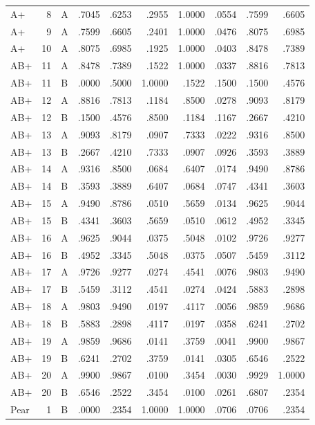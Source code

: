 \begin{longtable}{@{}lrlrrrrrrr@{}}
A+ & 8 & A & .7045 & .6253 & .2955 & 1.0000 & .0554 & .7599 & .6605 \\
A+ & 9 & A & .7599 & .6605 & .2401 & 1.0000 & .0476 & .8075 & .6985 \\
A+ & 10 & A & .8075 & .6985 & .1925 & 1.0000 & .0403 & .8478 & .7389 \\
AB+ & 11 & A & .8478 & .7389 & .1522 & 1.0000 & .0337 & .8816 & .7813 \\
AB+ & 11 & B & .0000 & .5000 & 1.0000 & .1522 & .1500 & .1500 & .4576 \\
AB+ & 12 & A & .8816 & .7813 & .1184 & .8500 & .0278 & .9093 & .8179 \\
AB+ & 12 & B & .1500 & .4576 & .8500 & .1184 & .1167 & .2667 & .4210 \\
AB+ & 13 & A & .9093 & .8179 & .0907 & .7333 & .0222 & .9316 & .8500 \\
AB+ & 13 & B & .2667 & .4210 & .7333 & .0907 & .0926 & .3593 & .3889 \\
AB+ & 14 & A & .9316 & .8500 & .0684 & .6407 & .0174 & .9490 & .8786 \\
AB+ & 14 & B & .3593 & .3889 & .6407 & .0684 & .0747 & .4341 & .3603 \\
AB+ & 15 & A & .9490 & .8786 & .0510 & .5659 & .0134 & .9625 & .9044 \\
AB+ & 15 & B & .4341 & .3603 & .5659 & .0510 & .0612 & .4952 & .3345 \\
AB+ & 16 & A & .9625 & .9044 & .0375 & .5048 & .0102 & .9726 & .9277 \\
AB+ & 16 & B & .4952 & .3345 & .5048 & .0375 & .0507 & .5459 & .3112 \\
AB+ & 17 & A & .9726 & .9277 & .0274 & .4541 & .0076 & .9803 & .9490 \\
AB+ & 17 & B & .5459 & .3112 & .4541 & .0274 & .0424 & .5883 & .2898 \\
AB+ & 18 & A & .9803 & .9490 & .0197 & .4117 & .0056 & .9859 & .9686 \\
AB+ & 18 & B & .5883 & .2898 & .4117 & .0197 & .0358 & .6241 & .2702 \\
AB+ & 19 & A & .9859 & .9686 & .0141 & .3759 & .0041 & .9900 & .9867 \\
AB+ & 19 & B & .6241 & .2702 & .3759 & .0141 & .0305 & .6546 & .2522 \\
AB+ & 20 & A & .9900 & .9867 & .0100 & .3454 & .0030 & .9929 & 1.0000 \\
AB+ & 20 & B & .6546 & .2522 & .3454 & .0100 & .0261 & .6807 & .2354 \\
Pear & 1 & B & .0000 & .2354 & 1.0000 & 1.0000 & .0706 & .0706 & .2354 \\

\end{longtable}
